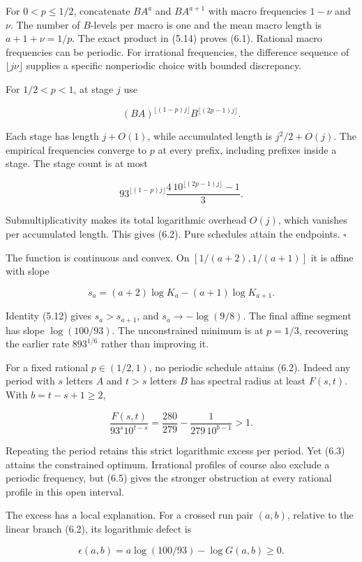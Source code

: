 \documentclass[11pt,a4paper]{article}
\begin{document}
For \(0<p\le1/2\), concatenate \(BA^a\) and \(BA^{a+1}\) with macro frequencies \(1-\nu\) and \(\nu\). The number of \(B\)-levels per macro is one and the mean macro length is \(a+1+\nu=1/p\). The exact product in (5.14) proves (6.1). Rational macro frequencies can be periodic. For irrational frequencies, the difference sequence of \(\lfloor j\nu\rfloor\) supplies a specific nonperiodic choice with bounded discrepancy.

For \(1/2<p<1\), at stage \(j\) use

\[
(BA)^{\lfloor(1-p)j\rfloor}
B^{\lfloor(2p-1)j\rfloor}.
\tag{6.3}
\]

Each stage has length \(j+O(1)\), while accumulated length is \(j^2/2+O(j)\). The empirical frequencies converge to \(p\) at every prefix, including prefixes inside a stage. The stage count is at most

\[
93^{\lfloor(1-p)j\rfloor}
\frac{4\,10^{\lfloor(2p-1)j\rfloor}-1}{3}.
\]

Submultiplicativity makes its total logarithmic overhead \(O(j)\), which vanishes per accumulated length. This gives (6.2). Pure schedules attain the endpoints. \(\square\)

The function is continuous and convex. On \([1/(a+2),1/(a+1)]\) it is affine with slope

\[
s_a=(a+2)\log K_a-(a+1)\log K_{a+1}.
\tag{6.4}
\]

Identity (5.12) gives \(s_a>s_{a+1}\), and \(s_a\to-\log(9/8)\). The final affine segment has slope \(\log(100/93)\). The unconstrained minimum is at \(p=1/3\), recovering the earlier rate \(893^{1/6}\) rather than improving it.

For a fixed rational \(p\in(1/2,1)\), no periodic schedule attains (6.2). Indeed any period with \(s\) letters \(A\) and \(t>s\) letters \(B\) has spectral radius at least \(F(s,t)\). With \(b=t-s+1\ge2\),

\[
\boxed{
\frac{F(s,t)}{93^s10^{t-s}}
=\frac{280}{279}-\frac{1}{279\,10^{b-1}}>1.
}
\tag{6.5}
\]

Repeating the period retains this strict logarithmic excess per period. Yet (6.3) attains the constrained optimum. Irrational profiles of course also exclude a periodic frequency, but (6.5) gives the stronger obstruction at every rational profile in this open interval.

The excess has a local explanation. For a crossed run pair \((a,b)\), relative to the linear branch (6.2), its logarithmic defect is

\[
\epsilon(a,b)=a\log(100/93)-\log G(a,b)\ge0.
\tag{6.6}
\]
\end{document}
